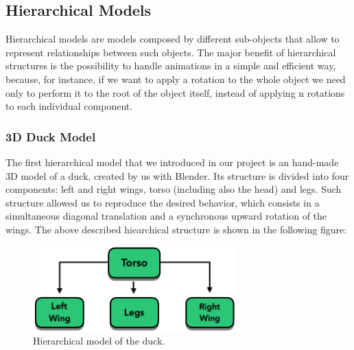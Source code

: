 \documentclass[12pt,a4paper]{article}
\begin{document}
	\subsection{Hierarchical Models}
	Hierarchical models are models composed by different sub-objects that allow to represent relationships between such objects. The major benefit of hierarchical structures is the possibility to handle animations in a simple and efficient way, because, for instance, if we want to apply a rotation to the whole object we need only to perform it to the root of the object itself, instead of applying n rotations to each individual component.
	\subsubsection{3D Duck Model}
	The first hierarchical model that we introduced in our project is an hand-made 3D model of a duck, created by us with Blender. Its structure is divided into four components: left and right wings, torso (including also the head) and legs. Such structure allowed us to reproduce the desired behavior, which consists in a simultaneous diagonal translation and a synchronous upward rotation of the wings. The above described hiearchical structure is shown in the following figure:
	\begin{figure}[hbt!]
		\centering
		\includegraphics[width=0.7\textwidth]{hier_duck}
		\caption{Hierarchical model of the duck.}
		\label{fig2}
	\end{figure}
	
\end{document}
